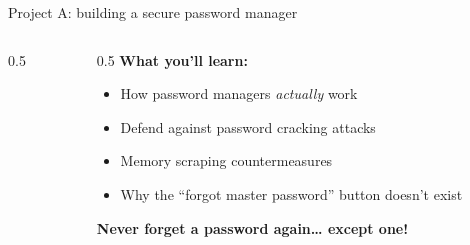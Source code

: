\ifdefined\PRESENTATION\else\PassOptionsToClass{handout}{beamer}\fi\documentclass[aspectratio=169, lualatex]{beamer}
\begin{document}
\begin{frame}{Project A: building a secure password manager}
	\begin{columns}[c]
		\begin{column}{0.5\textwidth}
		\end{column}
		\begin{column}{0.5\textwidth}
			\textbf{What you'll learn:}
			\begin{itemize}[<+->]
				\item How password managers \textit{actually} work
				\item Defend against password cracking attacks
				\item Memory scraping countermeasures
				\item Why the ``forgot master password'' button doesn't exist
			\end{itemize}
			\vspace{0.5cm}
			\textcolor{cipherprimary}{\textbf{Never forget a password again\ldots{} except one!}}
		\end{column}
	\end{columns}
\end{frame}
\end{document}
